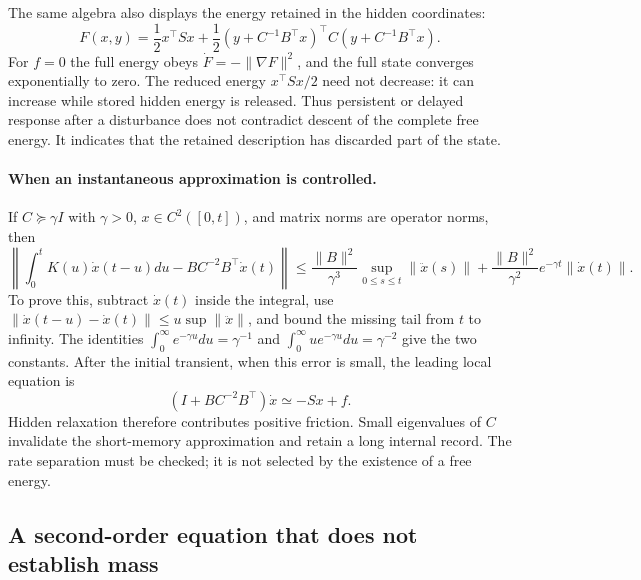 The same algebra also displays the energy retained in the hidden coordinates:
\begin{equation}
 F(x,y)=\frac12x^\top Sx
 +\frac12(y+C^{-1}B^\top x)^\top C(y+C^{-1}B^\top x).
 \label{eq:persistence_energy_split}
\end{equation}
For $f=0$ the full energy obeys $\dot F=-\|\nabla F\|^2$, and the full state converges exponentially to zero. The reduced energy $x^\top Sx/2$ need not decrease: it can increase while stored hidden energy is released. Thus persistent or delayed response after a disturbance does not contradict descent of the complete free energy. It indicates that the retained description has discarded part of the state.

\paragraph{When an instantaneous approximation is controlled.}
If $C\succeq\gamma I$ with $\gamma>0$, $x\in C^2([0,t])$, and matrix norms are operator norms, then
\begin{equation}
 \left\|\int_0^t K(u)\dot x(t-u)du-BC^{-2}B^\top\dot x(t)\right\|
 \le \frac{\|B\|^2}{\gamma^3}\sup_{0\le s\le t}\|\ddot x(s)\|
 +\frac{\|B\|^2}{\gamma^2}e^{-\gamma t}\|\dot x(t)\|.
 \label{eq:persistence_short_memory_bound}
\end{equation}
To prove this, subtract $\dot x(t)$ inside the integral, use
$\|\dot x(t-u)-\dot x(t)\|\le u\sup\|\ddot x\|$, and bound the missing tail from $t$ to infinity. The identities $\int_0^\infty e^{-\gamma u}du=\gamma^{-1}$ and $\int_0^\infty ue^{-\gamma u}du=\gamma^{-2}$ give the two constants. After the initial transient, when this error is small, the leading local equation is
\begin{equation}
 (I+BC^{-2}B^\top)\dot x\simeq-Sx+f.
\end{equation}
Hidden relaxation therefore contributes positive friction. Small eigenvalues of $C$ invalidate the short-memory approximation and retain a long internal record. The rate separation must be checked; it is not selected by the existence of a free energy.

\subsection{A second-order equation that does not establish mass}
\label{sec:persistence_second_order}

